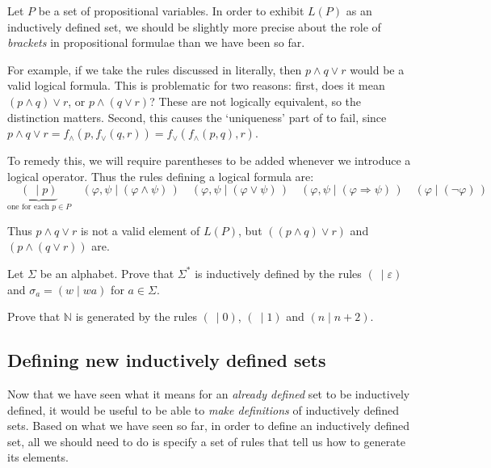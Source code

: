 \begin{example}
\label{exInductivelyDefinedSetOfPropositionalFormulae}
Let $P$ be a set of propositional variables. In order to exhibit $L(P)$ as an inductively defined set, we should be slightly more precise about the role of \textit{brackets} in propositional formulae than we have been so far.

For example, if we take the rules discussed in  literally, then $p \wedge q \vee r$ would be a valid logical formula. This is problematic for two reasons: first, does it mean $(p \wedge q) \vee r$, or $p \wedge (q \vee r)$? These are not logically equivalent, so the distinction matters. Second, this causes the `uniqueness' part of  to fail, since $p \wedge q \vee r = f_{\wedge}(p,f_{\vee}(q,r)) = f_{\vee}(f_{\wedge}(p,q),r)$.

To remedy this, we will require parentheses to be added whenever we introduce a logical operator. Thus the rules defining a logical formula are:
\[ \underbrace{(~ \mid p)}_{\text{one for each } p \in P} \quad (\varphi,\psi \mid (\varphi \wedge \psi)\,) \quad (\varphi,\psi \mid (\varphi \vee \psi)\,) \quad (\varphi,\psi \mid (\varphi \Rightarrow \psi)\,) \quad (\varphi \mid (\neg \varphi)\,) \]

Thus $p \wedge q \vee r$ is not a valid element of $L(P)$, but $((p \wedge q) \vee r)$ and $(p \wedge (q \vee r))$ are.
\end{example}

\begin{exercise}
Let $\Sigma$ be an alphabet. Prove that $\Sigma^*$ is inductively defined by the rules $(~ \mid \varepsilon)$ and $\sigma_a = (w \mid wa)$ for $a \in \Sigma$.
\end{exercise}

\begin{exercise}
Prove that $\mathbb{N}$ is generated by the rules $(~ \mid 0)$, $(~ \mid 1)$ and $(n \mid n+2)$.
\end{exercise}

\subsection*{Defining new inductively defined sets}

Now that we have seen what it means for an \textit{already defined} set to be inductively defined, it would be useful to be able to \textit{make definitions} of inductively defined sets. Based on what we have seen so far, in order to define an inductively defined set, all we should need to do is specify a set of rules that tell us how to generate its elements.

